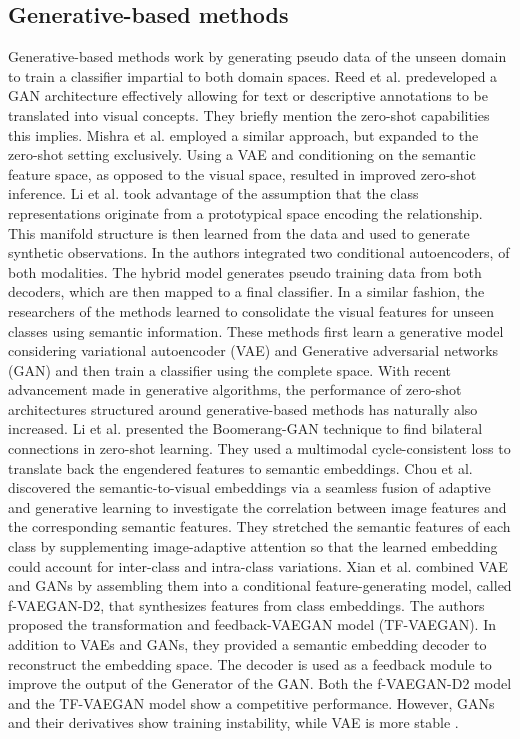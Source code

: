\documentclass{article}
\begin{document}
\subsection{Generative-based methods}
Generative-based methods work by generating pseudo data of the unseen domain to train a classifier impartial to both domain spaces. Reed et al. \cite{b69} predeveloped a GAN architecture effectively allowing for text or descriptive annotations to be translated into visual concepts. They briefly mention the zero-shot capabilities this implies. Mishra et al. \cite{b35} employed a similar approach, but expanded to the zero-shot setting exclusively. Using a VAE and conditioning on the semantic feature space, as opposed to the visual space, resulted in improved zero-shot inference. Li et al. \cite{b8} took advantage of the assumption that the class representations originate from a prototypical space encoding the relationship. This manifold structure is then learned from the data and used to generate synthetic observations. In \cite{b80} the authors integrated two conditional autoencoders, of both modalities. The hybrid model generates pseudo training data from both decoders, which are then mapped to a final classifier. In a similar fashion, the researchers of the methods \cite{b34, b35, b36, b37} learned to consolidate the visual features for unseen classes using semantic information. These methods first learn a generative model considering variational autoencoder (VAE) and Generative adversarial networks (GAN) and then train a classifier using the complete space. With recent advancement made in generative algorithms, the performance of zero-shot architectures structured around generative-based methods has naturally also increased.
Li et al. \cite{b39} presented the Boomerang-GAN technique to find bilateral connections in zero-shot learning. They used a multimodal cycle-consistent loss to translate back the engendered features to semantic embeddings. Chou et al. \cite{b40} discovered the semantic-to-visual embeddings via a seamless fusion of adaptive and generative learning to investigate the correlation between image features and the corresponding semantic features. They stretched the semantic features of each class by supplementing image-adaptive attention so that the learned embedding could account for inter-class and intra-class variations. Xian et al. \cite{b46} combined VAE and GANs by assembling them into a conditional feature-generating model, called f-VAEGAN-D2, that synthesizes features from class embeddings. The authors \cite{b47} proposed the transformation and feedback-VAEGAN model (TF-VAEGAN). In addition to VAEs and GANs, they provided a semantic embedding decoder to reconstruct the embedding space. The decoder is used as a feedback module to improve the output of the Generator of the GAN. Both the f-VAEGAN-D2 model \cite{b46} and the TF-VAEGAN model \cite{b47} show a competitive performance. However, GANs and their derivatives show training instability, while VAE is more stable  \cite{b48}. 
\end{document}

